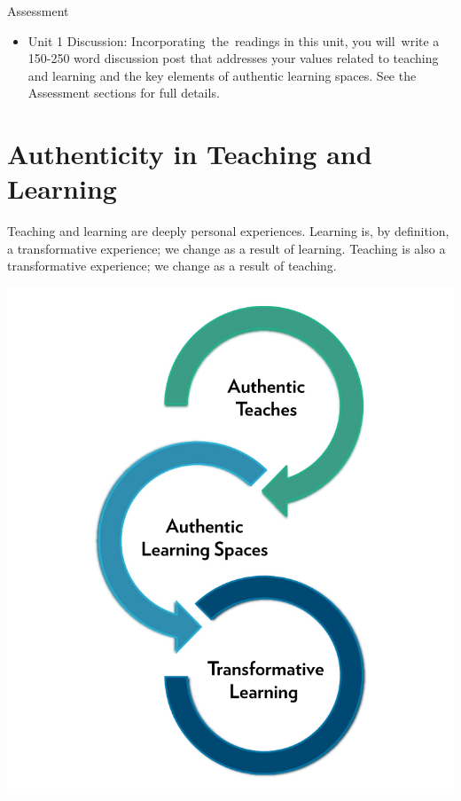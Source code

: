 \documentclass[
]{book}
\providecommand{\tightlist}{%
  \setlength{\itemsep}{0pt}\setlength{\parskip}{0pt}}
\begin{document}
\begin{assessment}
{Assessment}

\begin{itemize}
\tightlist
\item
  Unit 1 Discussion: Incorporating~the~readings in this unit, you
  will~write a 150-250 word discussion post that addresses your values
  related to teaching and learning and the key elements of authentic
  learning spaces. See the Assessment sections for full details.
\end{itemize}
\end{assessment}

\hypertarget{authenticity-in-teaching-and-learning}{%
\section{Authenticity in Teaching and Learning}\label{authenticity-in-teaching-and-learning}}

Teaching and learning are deeply personal experiences. Learning is, by definition, a transformative experience; we change as a result of learning. Teaching is also a transformative experience; we change as a result of teaching.

\includegraphics{assets/unit1/664-authentic-teachers.jpg}
\end{document}
